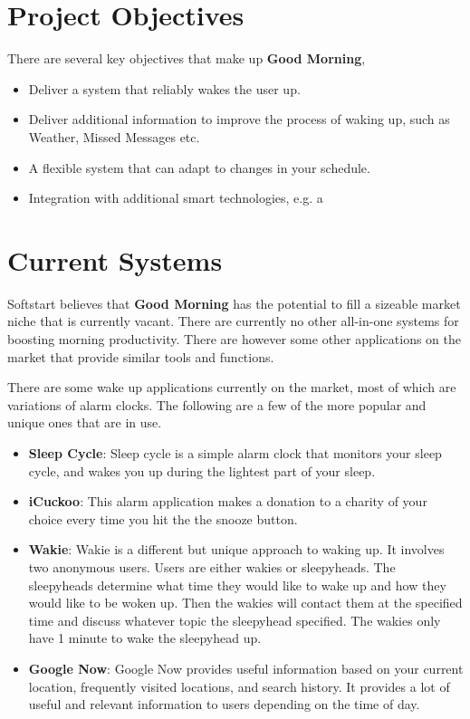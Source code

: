\documentclass[11pt]{article}
\begin{document}

%
\section{Project Objectives}\label{project-objectives}

There are several key objectives that make up \textbf{Good Morning},

\begin{itemize}
\item
  Deliver a system that reliably wakes the user up.
\item
  Deliver additional information to improve the process of waking up, such as Weather, Missed Messages etc.
\item
  A flexible system that can adapt to changes in your schedule.
\item
  Integration with additional smart technologies, e.g. a 
\end{itemize}


%
\section{Current Systems}\label{current-systems}

Softstart believes that \textbf{Good Morning} has the potential to fill
a sizeable market niche that is currently vacant. There are currently no other all-in-one systems
for boosting morning productivity. There are however some other applications
on the market that provide similar tools and functions.

There are some wake up applications currently on the market, most
of which are variations of alarm clocks. The following are a few of the more popular and unique ones that are in use.
\begin{itemize}
\item
    \textbf{Sleep Cycle}: Sleep cycle is a simple alarm clock that monitors your sleep
    cycle, and wakes you up during the lightest part of your sleep.
\item
    \textbf{iCuckoo}: This alarm application makes a donation to a charity of your choice every time you hit the
    the snooze button.
\item
    \textbf{Wakie}: Wakie is a different but unique approach to waking up. It
    involves two anonymous users. Users are either wakies or sleepyheads. 
    The sleepyheads determine what time they would like to wake up and how they would
    like to be woken up. Then the wakies will contact them at the specified time and 
    discuss whatever topic the sleepyhead specified. The wakies only have 1 minute to wake the sleepyhead up.
\item
	\textbf{Google Now}: Google Now provides useful information based on your current location, frequently
	visited locations, and search history. It provides a lot of useful and relevant information to users
	depending on the time of day.
\end{itemize}
\end{document}
